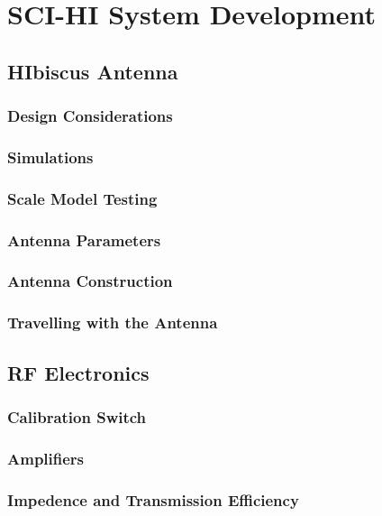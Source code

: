 \chapter{SCI-HI System Development}

\section{HIbiscus Antenna}

\subsection{Design Considerations}

\subsection{Simulations}

\subsection{Scale Model Testing}

\subsection{Antenna Parameters}

\subsection{Antenna Construction}

\subsection{Travelling with the Antenna}

\section{RF Electronics}

\subsection{Calibration Switch}

\subsection{Amplifiers}

\subsection{Impedence and Transmission Efficiency}

